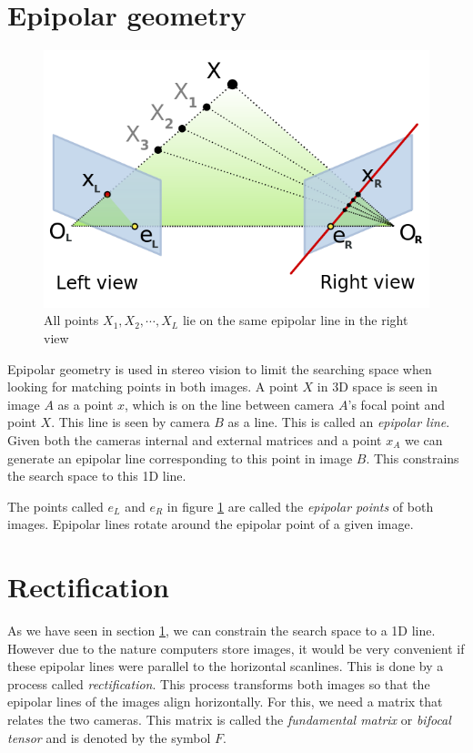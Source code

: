 \documentclass[a4paper]{article}
\begin{document}
\section{Epipolar geometry}
\label{epipolar}

\begin{figure}[h!]
  \label{fig:epipole}
  \centering
  \includegraphics[width=1.0\textwidth]{Epipolar_geometry}
  \caption{All points $X_{1}, X_{2}, \cdots, X_{L}$ lie on the same epipolar line in the right view}
\end{figure}

Epipolar geometry is used in stereo vision to limit the searching space when
looking for matching points in both images. A point $X$ in 3D space is seen in
image $A$ as a point $x$, which is on the line between camera $A$'s focal point
and point $X$. This line is seen by camera $B$ as a line. This is called an
\emph{epipolar line}. Given both the cameras internal and external matrices and
a point $x_A$ we can generate an epipolar line corresponding to this point in
image $B$. This constrains the search space to this 1D line.

The points called $e_{L}$ and $e_{R}$ in figure \ref{fig:epipole} are called the
\emph{epipolar points} of both images. Epipolar lines rotate around the epipolar
point of a given image.

\section{Rectification}
\label{rectification}
As we have seen in section \ref{epipolar}, we can constrain the search space to
a 1D line. However due to the nature computers store images, it would be very
convenient if these epipolar lines were parallel to the horizontal scanlines.
This is done by a process called \emph{rectification}. This process transforms
both images so that the epipolar lines of the images align horizontally. For
this, we need a matrix that relates the two cameras. This matrix is called the
\emph{fundamental matrix} or \emph{bifocal tensor} and is denoted by the symbol
$F$.
\end{document}
